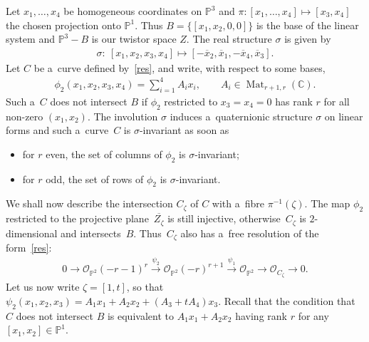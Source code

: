 \documentclass[pdftex]{sigma}
\numberwithin{equation}{section}
\begin{document}
Let $x_1,\dots,x_4$ be homogeneous coordinates on ${\mathbb{P}}^3$ and $\pi:[x_1,\dots,x_4]\mapsto [x_3,x_4]$ the chosen
projection onto ${\mathbb{P}}^1$.
Thus $B=\{[x_1,x_2,0,0]\}$ is the base of the linear system and ${\mathbb{P}}^3-B$ is our twistor space $Z$.
The real structure $\sigma$ is given by
\begin{gather*}
\sigma: \ [x_1,x_2,x_3,x_4]\mapsto [-\overline{x}_2,\overline{x}_1,-\overline{x}_4,\overline{x}_3].
\end{gather*}
Let $C$ be a~curve def\/ined by~\eqref{res}, and write, with respect to some bases,
\begin{gather*}
\phi_2(x_1,x_2,x_3,x_4)=\sum\limits_{i=1}^4 A_ix_i,
\qquad
A_i\in \operatorname{Mat}_{r+1,r}({\mathbb C}).
\end{gather*}
Such a~$C$ does not intersect $B$ if $\phi_2$ restricted to
$x_3=x_4=0$ has rank $r$ for all non-zero $(x_1,x_2)$.
The involution $\sigma$ induces a~quaternionic structure $\sigma$ on linear forms and such a~curve~$C$ is
$\sigma$-invariant as soon as
\begin{itemize}\itemsep=0pt
\item
for $r$ even, the set of columns of $\phi_2$ is $\sigma$-invariant;
\item
for $r$ odd, the set of rows of $\phi_2$ is $\sigma$-invariant.
\end{itemize}

We shall now describe the intersection $C_{\zeta}$ of $C$ with a~f\/ibre $\pi^{-1}(\zeta)$.
The map $\phi_2$ restricted to the projective plane~$\overline{Z_\zeta}$ is still injective, otherwise~$C_\zeta$ is
$2$-dimensional and intersects~$B$.
Thus~$C_\zeta$ also has a~free resolution of the form~\eqref{res}:
\begin{gather}
0\to {\mathcal{O}}_{{\mathbb{P}}^2}(-r-1)^r\stackrel{\psi_2}{\longrightarrow} {\mathcal{O}}_{{\mathbb{P}}^2}(-r)^{r+1}
\stackrel{\psi_1}{\longrightarrow} {\mathcal{O}}_{{\mathbb{P}}^2} \longrightarrow {\mathcal{O}}_{C_\zeta}\to 0.
\label{res3}
\end{gather}
Let us now write $\zeta=[1,t]$, so that $\psi_2(x_1,x_2,x_3)=A_1x_1+A_2x_2+(A_3+tA_4)x_3$.
Recall that the condition that $C$ does not intersect $B$ is equivalent to $A_1x_1+A_2x_2$ having rank $r$ for any
$[x_1,x_2]\in {\mathbb{P}}^1$.
\end{document}
